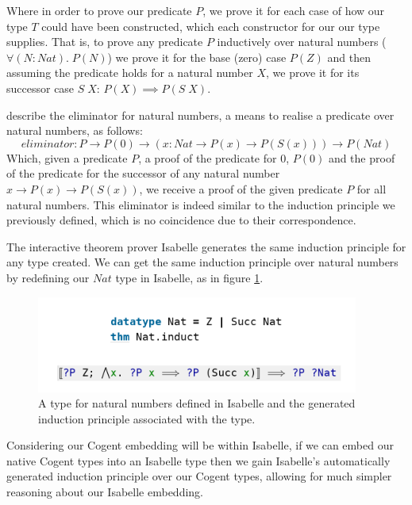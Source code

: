 Where in order to prove our predicate $P$, we prove it for each case of how our type $T$ could have been
constructed, which each constructor for our our type supplies.
That is, to prove any predicate $P$ inductively over natural numbers ($\forall(N : Nat).\; P(N)$)
we prove it for the base (zero) case $P(Z)$ and then assuming the predicate holds
for a natural number $X$, we prove it for its successor case $S\; X$: $P(X) \implies P(S\; X)$.

\citet{CoquandTypes} describe the eliminator for natural numbers, a means to realise a predicate over
natural numbers, as follows:
\[
    eliminator : P \rightarrow P (0) \rightarrow (x : Nat \rightarrow P (x) \rightarrow P(S(x))) \rightarrow P(Nat)    
\]
Which, given a predicate $P$, a proof of the predicate for $0$, $P(0)$ and the proof of the predicate
for the successor of any natural number $x  \rightarrow P (x) \rightarrow P(S(x))$, we receive a proof
of the given predicate $P$ for all natural numbers. This eliminator is indeed similar to the induction
principle we previously defined, which is no coincidence due to their correspondence.

The interactive theorem prover Isabelle generates the same induction principle for any type created.
We can get the same induction principle over natural numbers by redefining our $Nat$
type in Isabelle, as in figure \ref{fig:IsabelleNatInduct}.

\begin{figure}
    \centering

    \includegraphics[width=300pt]{content/isabelleNatInduct.png}
    \caption{A type for natural numbers defined in Isabelle and the generated 
    induction principle associated with the type.}
    \label{fig:IsabelleNatInduct}
\end{figure}

\FloatBarrier

Considering our Cogent embedding will be within Isabelle, if we can embed our native
Cogent types into an Isabelle type then we gain Isabelle's automatically generated
induction principle over our Cogent types, allowing for much 
simpler reasoning about our Isabelle embedding.

